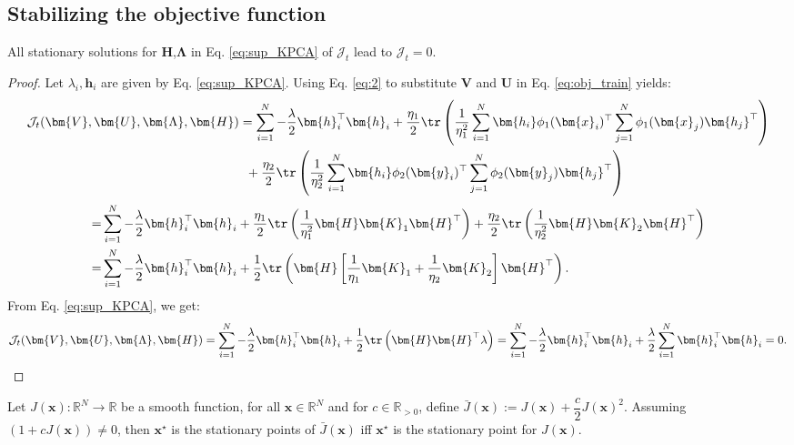 \documentclass[preview,border=0.3pt]{standalone}
\begin{document}
\subsection{Stabilizing the objective function \label{sec:stabilizationTerm}}
%
\begin{proposition}\label{prop2}
    All stationary solutions for $\bm{H}$,$\bm{\Lambda}$ in Eq. \ref{eq:sup_KPCA} of $ \mathcal{J}_{t} $ lead to $ \mathcal{J}_{t}=0 $.
\end{proposition}
\begin{proof}
    Let $\lambda_i, \bm{h}_i$ are given by Eq. \ref{eq:sup_KPCA}. Using Eq. \ref{eq:2} to substitute $ \bm{V} $ and $ \bm{U} $  in Eq. \ref{eq:obj_train} yields:
    \[\begin{aligned}
            \mathcal{J}_t(\bm{V},\bm{U},\bm{\Lambda},\bm{H}) & = \sum_{i=1}^{N} - \frac{\lambda}{2} \bm{h}_{i}^\top \bm{h}_i + \frac{\eta_{1}}{2}\tr\left(\dfrac{1}{\eta_{1}^2} \sum_{i=1}^{N} \bm{h_{i}} \phi_{1}(\bm{x}_{i})^\top  \sum_{j=1}^{N} \phi_{1}(\bm{x}_{j}) \bm{h_{j}}^\top \right) \\
                                                             & \enskip + \frac{\eta_{2}}{2}\tr\left(\dfrac{1}{\eta_{2}^2} \sum_{i=1}^{N} \bm{h_{i}} \phi_{2}(\bm{y}_{i})^\top  \sum_{j=1}^{N} \phi_{2}(\bm{y}_{j}) \bm{h_{j}}^\top \right)
        \end{aligned}
    \]
    \[\begin{aligned}
            = & \sum_{i=1}^{N} - \frac{\lambda}{2} \bm{h}_{i}^\top \bm{h}_i + \frac{\eta_{1}}{2}\tr\left(\dfrac{1}{\eta_{1}^2}\bm{H}\bm{K}_{1}\bm{H}^\top \right) + \frac{\eta_{2}}{2}\tr\left(\dfrac{1}{\eta_{2}^2}\bm{H}\bm{K}_{2}\bm{H}^\top\right) \\
            = & \sum_{i=1}^{N} - \frac{\lambda}{2} \bm{h}_{i}^\top \bm{h}_i + \frac{1}{2}\tr\left(\bm{H} \left[\dfrac{1}{\eta_{1}}\bm{K}_{1} + \dfrac{1}{\eta_{2}}\bm{K}_{2}\right]\bm{H}^\top\right).
        \end{aligned}
    \]
    From Eq. \ref{eq:sup_KPCA}, we get:
    \[\mathcal{J}_t(\bm{V},\bm{U},\bm{\Lambda},\bm{H}) = \sum_{i=1}^{N} - \frac{\lambda}{2} \bm{h}_{i}^\top \bm{h}_i + \frac{1}{2}\tr\left(\bm{H} \bm{H}^\top \lambda \right)
        = \sum_{i=1}^{N} - \frac{\lambda}{2} \bm{h}_{i}^\top \bm{h}_i + \frac{\lambda}{2}\sum_{i=1}^{N} \bm{h}_{i}^\top \bm{h}_{i}
        =   0.
    \]
\end{proof}
%
%
\begin{proposition}\label{prop1}
    Let $ J(\bm{x}):\mathbb{R}^N\xrightarrow{}\mathbb{R} $ be a smooth function, for all $ \bm{x}\in \mathbb{R}^N$ and for $ c\in \mathbb{R}_{>0} $,   define $ \bar{J}(\bm{x}) := J(\bm{x}) + \dfrac{c}{2}J(\bm{x})^{2} $. Assuming $(1+cJ(\bm{x}))\neq 0$, then $\bm{x}^{\star}$ is the stationary points of $ \bar{J}(\bm{x})$ iff $\bm{x}^{\star}$ is the stationary point for $ {J}(\bm{x})$.
\end{proposition}
\end{document}
